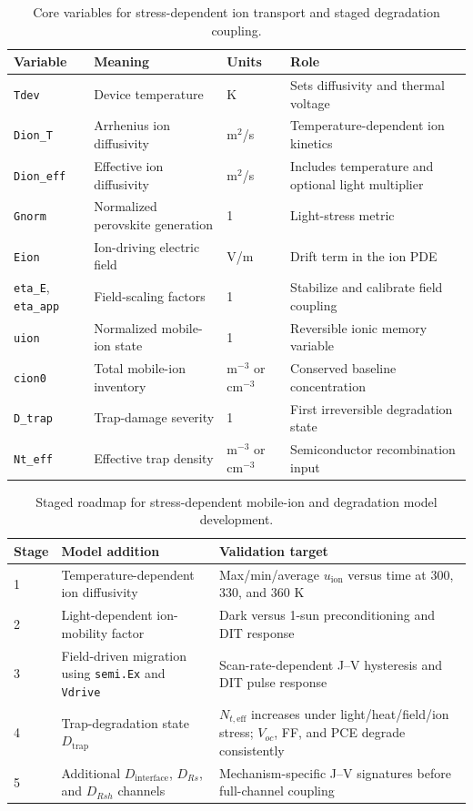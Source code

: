 \begin{table}[H]
\centering
\scriptsize
\caption{Core variables for stress-dependent ion transport and staged degradation coupling.}
\label{tab:stress_dependent_ion_variables}
\begin{tabular}{@{}p{}p{}p{}p{}@{}}
\toprule
Variable & Meaning & Units & Role \\
\midrule
\texttt{Tdev} & Device temperature & K & Sets diffusivity and thermal voltage \\
\texttt{Dion\_T} & Arrhenius ion diffusivity & m$^2$/s & Temperature-dependent ion kinetics \\
\texttt{Dion\_eff} & Effective ion diffusivity & m$^2$/s & Includes temperature and optional light multiplier \\
\texttt{Gnorm} & Normalized perovskite generation & 1 & Light-stress metric \\
\texttt{Eion} & Ion-driving electric field & V/m & Drift term in the ion PDE \\
\texttt{eta\_E}, \texttt{eta\_app} & Field-scaling factors & 1 & Stabilize and calibrate field coupling \\
\texttt{uion} & Normalized mobile-ion state & 1 & Reversible ionic memory variable \\
\texttt{cion0} & Total mobile-ion inventory & m$^{-3}$ or cm$^{-3}$ & Conserved baseline concentration \\
\texttt{D\_trap} & Trap-damage severity & 1 & First irreversible degradation state \\
\texttt{Nt\_eff} & Effective trap density & m$^{-3}$ or cm$^{-3}$ & Semiconductor recombination input \\
\bottomrule
\end{tabular}
\end{table}

\begin{table}[H]
\centering
\footnotesize
\caption{Staged roadmap for stress-dependent mobile-ion and degradation model development.}
\label{tab:stress_dependent_model_roadmap}
\begin{tabular}{p{}p{}p{}}
\toprule
Stage & Model addition & Validation target \\
\midrule
1 & Temperature-dependent ion diffusivity & Max/min/average $u_{\mathrm{ion}}$ versus time at 300, 330, and 360 K \\
2 & Light-dependent ion-mobility factor & Dark versus 1-sun preconditioning and DIT response \\
3 & Field-driven migration using \texttt{semi.Ex} and \texttt{Vdrive} & Scan-rate-dependent J--V hysteresis and DIT pulse response \\
4 & Trap-degradation state $D_{\mathrm{trap}}$ & $N_{t,\mathrm{eff}}$ increases under light/heat/field/ion stress; $V_{oc}$, FF, and PCE degrade consistently \\
5 & Additional $D_{\mathrm{interface}}$, $D_{Rs}$, and $D_{Rsh}$ channels & Mechanism-specific J--V signatures before full-channel coupling \\
\bottomrule
\end{tabular}
\end{table}

